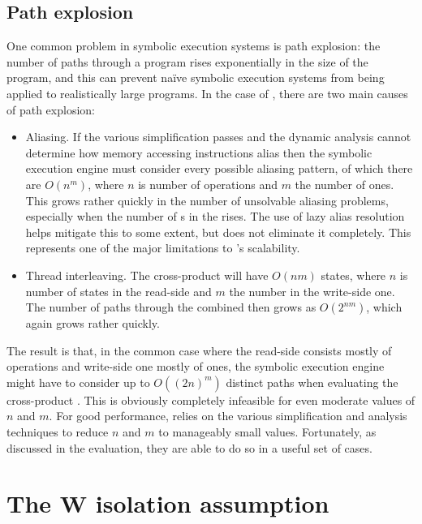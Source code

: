 \subsection{Path explosion}

One common problem in symbolic execution systems is path explosion:
the number of paths through a program rises exponentially in the size
of the program, and this can prevent na\"ive symbolic execution
systems from being applied to realistically large programs.  In the
case of \technique, there are two main causes of path explosion:

\begin{itemize}
\item
  Aliasing.  If the various simplification passes and the dynamic
  analysis cannot determine how memory accessing instructions alias
  then the symbolic execution engine must consider every possible
  aliasing pattern, of which there are $O(n^m)$, where $n$ is number
  of  operations and $m$ the number of  ones.
  This grows rather quickly in the number of unsolvable aliasing
  problems, especially when the number of s in the
  {\StateMachine} rises.  The use of lazy alias resolution helps
  mitigate this to some extent, but does not eliminate it completely.
  This represents one of the major limitations to \technique's
  scalability.
\item
  Thread interleaving.  The cross-product {\StateMachine} will have
  $O(nm)$ states, where $n$ is number of states in the read-side
  {\StateMachine} and $m$ the number in the write-side one.  The
  number of paths through the combined {\StateMachine} then grows as
  $O(2^{nm})$, which again grows rather quickly.
\end{itemize}

The result is that, in the common case where the read-side
{\StateMachine} consists mostly of  operations and
write-side one mostly of  ones, the symbolic execution
engine might have to consider up to $O((2n)^m)$ distinct paths when
evaluating the cross-product {\StateMachine}.  This is obviously
completely infeasible for even moderate values of $n$ and $m$.  For
good performance, {\technique} relies on the various simplification
and analysis techniques to reduce $n$ and $m$ to manageably small
values.  Fortunately, as discussed in the evaluation, they are able to
do so in a useful set of cases.

\section{The W isolation assumption}
\label{sect:derive:w_isolation}

